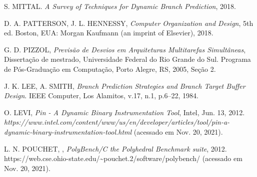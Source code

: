 \documentclass[journal, twoside]{IEEEtran}
\begin{document}
\begin{thebibliography}{1}

S. MITTAL. \emph{A Survey of Techniques for Dynamic Branch Prediction}, 2018.

D. A. PATTERSON, J. L. HENNESSY, \emph{Computer Organization and Design}, 5th ed. Boston, EUA: Morgan Kaufmann (an imprint of Elsevier), 2018. 

G. D. PIZZOL, \emph{Previsão de Desvios em Arquiteturas Multitarefas Simultâneas}, Dissertação de mestrado, Universidade Federal do Rio Grande do Sul. Programa de Pós-Graduação em Computação, Porto Alegre, RS, 2005, Seção 2.

J. K. LEE, A. SMITH, \emph{Branch Prediction Strategies and Branch Target Buffer Design}. IEEE Computer, Los Alamitos, v.17, n.1, p.6–22, 1984.

O. LEVI, \emph{Pin - A Dynamic Binary Instrumentation Tool}, Intel, Jun. 13, 2012. \emph{https://www.intel.com/content/www/us/en/developer/articles/tool/pin-a-dynamic-binary-instrumentation-tool.html} (acessado em Nov. 20, 2021).

L. N. POUCHET, , \emph{PolyBench/C the Polyhedral Benchmark suite}, 2012. https://web.cse.ohio-state.edu/\textasciitilde{}pouchet.2/software/polybench/ (acessado em Nov. 20, 2021).

\end{thebibliography}
\end{document}
